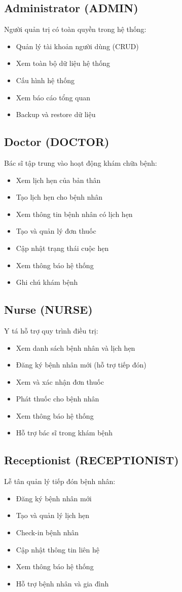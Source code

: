 \documentclass[12pt,a4paper]{report}
\begin{document}
\subsection{Administrator (ADMIN)}
Người quản trị có toàn quyền trong hệ thống:
\begin{itemize}
    \item Quản lý tài khoản người dùng (CRUD)
    \item Xem toàn bộ dữ liệu hệ thống
    \item Cấu hình hệ thống
    \item Xem báo cáo tổng quan
    \item Backup và restore dữ liệu
\end{itemize}

\subsection{Doctor (DOCTOR)}
Bác sĩ tập trung vào hoạt động khám chữa bệnh:
\begin{itemize}
    \item Xem lịch hẹn của bản thân
    \item Tạo lịch hẹn cho bệnh nhân
    \item Xem thông tin bệnh nhân có lịch hẹn
    \item Tạo và quản lý đơn thuốc
    \item Cập nhật trạng thái cuộc hẹn
    \item Xem thông báo hệ thống
    \item Ghi chú khám bệnh
\end{itemize}

\subsection{Nurse (NURSE)}
Y tá hỗ trợ quy trình điều trị:
\begin{itemize}
    \item Xem danh sách bệnh nhân và lịch hẹn
    \item Đăng ký bệnh nhân mới (hỗ trợ tiếp đón)
    \item Xem và xác nhận đơn thuốc
    \item Phát thuốc cho bệnh nhân
    \item Xem thông báo hệ thống
    \item Hỗ trợ bác sĩ trong khám bệnh
\end{itemize}

\subsection{Receptionist (RECEPTIONIST)}
Lễ tân quản lý tiếp đón bệnh nhân:
\begin{itemize}
    \item Đăng ký bệnh nhân mới
    \item Tạo và quản lý lịch hẹn
    \item Check-in bệnh nhân
    \item Cập nhật thông tin liên hệ
    \item Xem thông báo hệ thống
    \item Hỗ trợ bệnh nhân và gia đình
\end{itemize}
\end{document}
